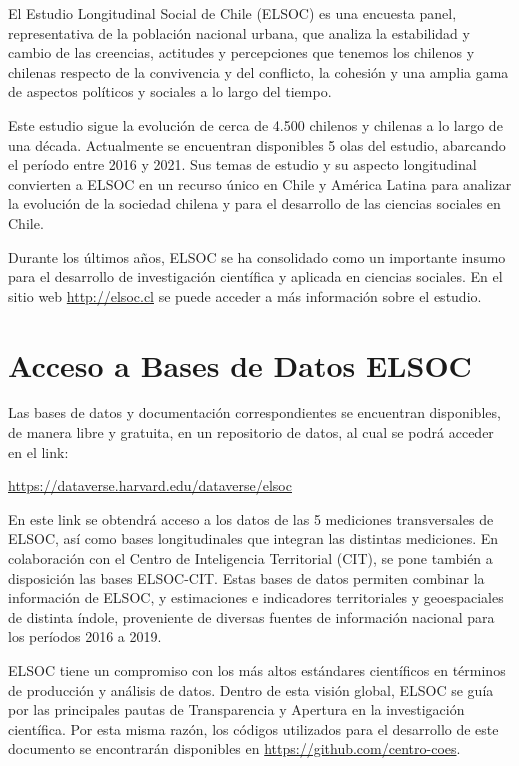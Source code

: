 \documentclass[
  12pt,
]{book}
\begin{document}
El Estudio Longitudinal Social de Chile (ELSOC) es una encuesta panel, representativa de la población nacional urbana, que analiza la estabilidad y cambio de las creencias, actitudes y percepciones que tenemos los chilenos y chilenas respecto de la convivencia y del conflicto, la cohesión y una amplia gama de aspectos políticos y sociales a lo largo del tiempo.

Este estudio sigue la evolución de cerca de 4.500 chilenos y chilenas a lo largo de una década. Actualmente se encuentran disponibles 5 olas del estudio, abarcando el período entre 2016 y 2021. Sus temas de estudio y su aspecto longitudinal convierten a ELSOC en un recurso único en Chile y América Latina para analizar la evolución de la sociedad chilena y para el desarrollo de las ciencias sociales en Chile.

Durante los últimos años, ELSOC se ha consolidado como un importante insumo para el desarrollo de investigación científica y aplicada en ciencias sociales. En el sitio web \url{http://elsoc.cl} se puede acceder a más información sobre el estudio.

\hypertarget{acceso-a-bases-de-datos-elsoc}{%
\section{Acceso a Bases de Datos ELSOC}\label{acceso-a-bases-de-datos-elsoc}}

Las bases de datos y documentación correspondientes se encuentran disponibles, de manera libre y gratuita, en un repositorio de datos, al cual se podrá acceder en el link:

\url{https://dataverse.harvard.edu/dataverse/elsoc}

En este link se obtendrá acceso a los datos de las 5 mediciones transversales de ELSOC, así como bases longitudinales que integran las distintas mediciones. En colaboración con el Centro de Inteligencia Territorial (CIT), se pone también a disposición las bases ELSOC-CIT. Estas bases de datos permiten combinar la información de ELSOC, y estimaciones e indicadores territoriales y geoespaciales de distinta índole, proveniente de diversas fuentes de información nacional para los períodos 2016 a 2019.

ELSOC tiene un compromiso con los más altos estándares científicos en términos de producción y análisis de datos. Dentro de esta visión global, ELSOC se guía por las principales pautas de Transparencia y Apertura en la investigación científica. Por esta misma razón, los códigos utilizados para el desarrollo de este documento se encontrarán disponibles en \url{https://github.com/centro-coes}.
\end{document}
